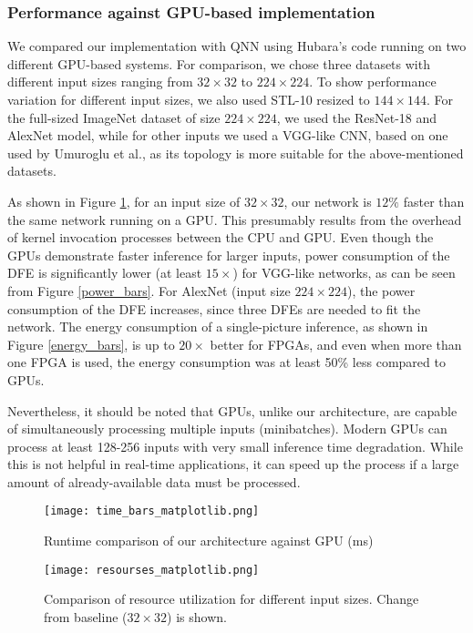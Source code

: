 \documentclass[conference]{IEEEtran}
\begin{document}
	\subsubsection{Performance against GPU-based implementation}
	\label{gpu_per}
	We compared our implementation with QNN using Hubara's code \cite{DBLP:journals/corr/HubaraCSEB16} running on two different GPU-based systems. For comparison, we chose three datasets with different input sizes ranging from $32\times32$ to $224\times224$. To show performance variation for different input sizes, we also used STL-10 resized to $144 \times 144$. For the full-sized ImageNet dataset of size $224\times224$, we used the ResNet-18 and AlexNet model, while for other inputs we used a VGG-like CNN, based on one used by Umuroglu et al., as its topology is more suitable for the above-mentioned datasets. 
	
	As shown in Figure \ref{time_bars}, for an input size of $32\times 32$, our network is $12\%$ faster than the same network running on a GPU. This presumably results from the overhead of kernel invocation processes between the CPU and GPU. Even though the GPUs demonstrate faster inference for larger inputs, power consumption of the DFE is significantly lower (at least $15\times$) for VGG-like networks, as can be seen from Figure \ref{power_bars}. For AlexNet (input size $224\times224$), the power consumption of the DFE increases, since three DFEs are needed to fit the network. 
	The energy consumption of a single-picture inference, as shown in Figure \ref{energy_bars}, is up to $20\times$ better for FPGAs, and even when more than one FPGA is used, the energy consumption was at least 50\% less compared to GPUs.
	
	
	Nevertheless, it should be noted that GPUs, unlike our architecture, are capable of simultaneously processing multiple inputs (minibatches). Modern GPUs can process at least 128-256 inputs with very small inference time degradation. While this is not helpful in real-time applications, it can speed up the process if a large amount of already-available data must be processed.
	
	\begin{figure}
		\centering
		
		\texttt{[image: time\_bars\_matplotlib.png]}
		\vspace{-2em}
		\caption{Runtime comparison of our architecture against GPU (ms)}
		\label{time_bars}
	\end{figure}
	
	\begin{figure}
		\centering	
		\texttt{[image: resourses\_matplotlib.png]}
		\vspace{-1em}
		\caption{Comparison of resource utilization for different input sizes. Change from baseline ($32 \times 32$) is shown.}
		\label{comparison_plots}
		\vspace{-1em}
	\end{figure}
	
\end{document}
